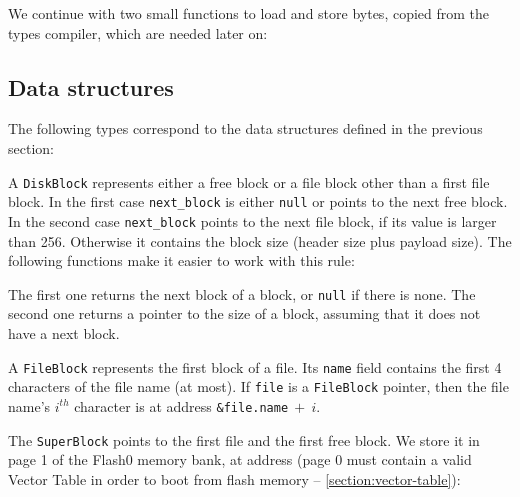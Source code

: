 We continue with two small functions to load and store bytes, copied from the
types compiler, which are needed later on:


\subsection{Data structures}

The following types correspond to the data structures defined
in the previous section:


A {\tt DiskBlock} represents either a free block or a file block other than a
first file block. In the first case {\tt next\_block} is either {\tt null} or
points to the next free block. In the second case {\tt next\_block} points to
the next file block, if its value is larger than 256. Otherwise it contains the
block size (header size plus payload size). The following functions make it
easier to work with this rule:


The first one returns the next block of a block, or {\tt null} if there is
none. The second one returns a pointer to the size of a block,
assuming that it does not have a next block.

A {\tt FileBlock} represents the first block of a file. Its {\tt name} field
contains the first 4 characters of the file name (at most). If {\tt file} is a
{\tt FileBlock} pointer, then the file name's $i^{th}$ character is at address
{\tt \&file.name}$\ +\ i$.

The {\tt SuperBlock} points to the first file and the first free block. We
store it in page 1 of the Flash0 memory bank, at address
 (page 0 must contain a valid Vector Table in order to
boot from flash memory -- \cf \cref{section:vector-table}):


